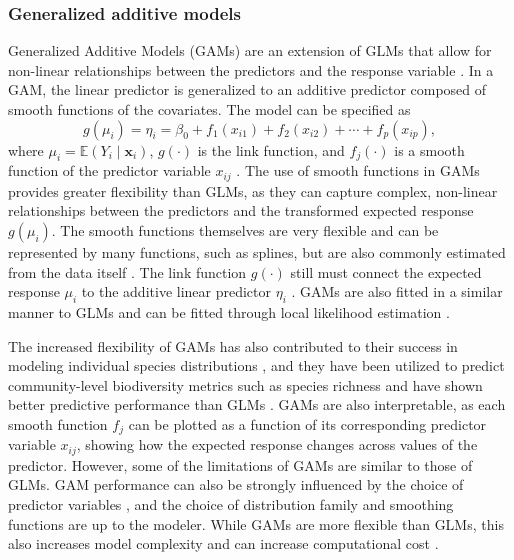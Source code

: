 \subsubsection{Generalized additive models}
Generalized Additive Models (GAMs) are an extension of GLMs that allow for non-linear relationships between the predictors and the response variable \parencite{hastie1986}. In a GAM, the linear predictor is generalized to an additive predictor composed of smooth functions of the covariates. The model can be specified as
\[
g(\mu_i) = \eta_i = \beta_0 + f_1(x_{i1}) + f_2(x_{i2}) + \cdots + f_p(x_{ip}),
\]
where \(\mu_i = \mathbb{E}(Y_i \mid \mathbf{x}_i)\), \(g(\cdot)\) is the link function, and \(f_j(\cdot)\) is a smooth function of the predictor variable \(x_{ij}\) \parencite{hastie1986}. The use of smooth functions in GAMs provides greater flexibility than GLMs, as they can capture complex, non-linear relationships between the predictors and the transformed expected response \(g(\mu_i)\). The smooth functions themselves are very flexible and can be represented by many functions, such as splines, but are also commonly estimated from the data itself \parencite{hastie1986, yee_generalized_1991}. The link function \(g(\cdot)\) still must connect the expected response \(\mu_i\) to the additive linear predictor \(\eta_i\) \parencite{hastie1986}. GAMs are also fitted in a similar manner to GLMs and can be fitted through local likelihood estimation \parencite{hastie1986}.

The increased flexibility of GAMs has also contributed to their success in modeling individual species distributions \parencite{valavi2022}, and they have been utilized to predict community-level biodiversity metrics such as species richness and have shown better predictive performance than GLMs \parencite{mondal2021, cai2023}. GAMs are also interpretable, as each smooth function \(f_j\) can be plotted as a function of its corresponding predictor variable \(x_{ij}\), showing how the expected response changes across values of the predictor. However, some of the limitations of GAMs are similar to those of GLMs. GAM performance can also be strongly influenced by the choice of predictor variables \parencite{guisan2002}, and the choice of distribution family and smoothing functions are up to the modeler. While GAMs are more flexible than GLMs, this also increases model complexity and can increase computational cost \parencite{mondal2021}.

